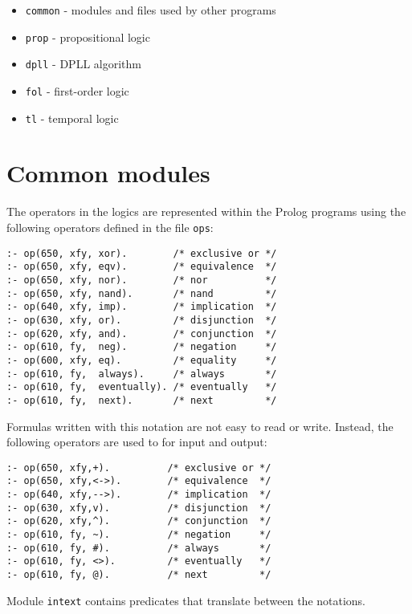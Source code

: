 \documentclass[11pt]{article}
\newcommand*{\p}[1]{\textup{\texttt{#1}}}
\begin{document}
\begin{itemize}
\item \p{common} - modules and files used by other programs
\item \p{prop}   - propositional logic
\item \p{dpll}   - DPLL algorithm
\item \p{fol}    - first-order logic
\item \p{tl}     - temporal logic
\end{itemize}



\section{Common modules}\label{s.common}

The operators in the logics are represented within the Prolog programs
using the following operators defined in the file \p{ops}:

\begin{verbatim}
:- op(650, xfy, xor).        /* exclusive or */
:- op(650, xfy, eqv).        /* equivalence  */
:- op(650, xfy, nor).        /* nor          */
:- op(650, xfy, nand).       /* nand         */
:- op(640, xfy, imp).        /* implication  */
:- op(630, xfy, or).         /* disjunction  */
:- op(620, xfy, and).        /* conjunction  */
:- op(610, fy,  neg).        /* negation     */
:- op(600, xfy, eq).         /* equality     */
:- op(610, fy,  always).     /* always       */
:- op(610, fy,  eventually). /* eventually   */
:- op(610, fy,  next).       /* next         */
\end{verbatim}

Formulas written with this notation are not easy to read or write.
Instead, the following operators are used to for input and output:

\begin{verbatim}
:- op(650, xfy,+).          /* exclusive or */
:- op(650, xfy,<->).        /* equivalence  */
:- op(640, xfy,-->).        /* implication  */
:- op(630, xfy,v).          /* disjunction  */
:- op(620, xfy,^).          /* conjunction  */
:- op(610, fy, ~).          /* negation     */
:- op(610, fy, #).          /* always       */
:- op(610, fy, <>).         /* eventually   */
:- op(610, fy, @).          /* next         */
\end{verbatim}

Module \p{intext} contains predicates that translate between the
notations.
\end{document}
